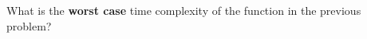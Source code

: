 \begin{prob}
    What is the \textbf{worst case} time complexity of the function in the previous problem?


\end{prob}
